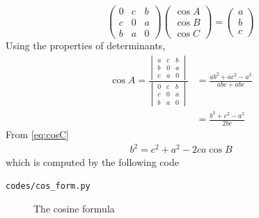 \documentclass[journal,12pt,twocolumn]{IEEEtran}
\renewcommand\thesection{\arabic{section}}
\begin{document}
\begin{enumerate}[label=\thesection.\arabic*
,ref=\thesection.\theenumi]
\begin{equation}
\begin{pmatrix}
0 & c & b \\
c & 0 & a \\
b & a & 0
\end{pmatrix}
\begin{pmatrix}
\cos A \\
\cos B \\
\cos C
\end{pmatrix}
= 
\begin{pmatrix}
a\\
b\\
c
\end{pmatrix}
\end{equation}
%
Using the properties of determinants,
%
\begin{align}
\cos A = \frac{
\begin{vmatrix}
a & c & b \\
b & 0 & a \\
c & a & 0
\end{vmatrix}
	}
	{
\begin{vmatrix}
0 & c & b \\
c & 0 & a \\
b & a & 0
\end{vmatrix}
	}
	&=\frac{ab^2 + ac^2 - a^3}{abc + abc} 
\\
&= \frac{b^2 + c^2 - a^2}{2bc}
\label{eq:cosC}
\end{align}
From \eqref{eq:cosC}
\begin{align}
\label{eq:b_cos_form}
b^2 = c^2+a^2-2ca\cos B
\end{align}
which is computed by the following code
\begin{lstlisting}
codes/cos_form.py
\end{lstlisting}
%
\begin{figure}[!ht]
	\begin{center}
		
		\resizebox{\columnwidth}{!}{}
	\end{center}
	\caption{The cosine formula}
	\label{ch2_cosine_formula}	
\end{figure}


\end{enumerate}
\end{document}
